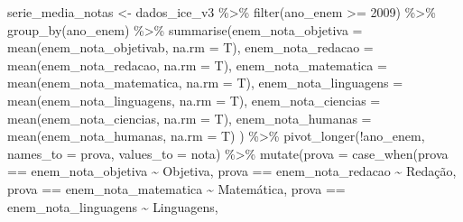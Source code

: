\documentclass[
  letterpaper,
  DIV=11,
  numbers=noendperiod]{scrartcl}
\newenvironment{Shaded}{\begin{snugshade}}{\end{snugshade}}
\newcommand{\AttributeTok}[1]{\textcolor[rgb]{0.40,0.45,0.13}{#1}}
\newcommand{\DecValTok}[1]{\textcolor[rgb]{0.68,0.00,0.00}{#1}}
\newcommand{\FunctionTok}[1]{\textcolor[rgb]{0.28,0.35,0.67}{#1}}
\newcommand{\NormalTok}[1]{\textcolor[rgb]{0.00,0.23,0.31}{#1}}
\newcommand{\OtherTok}[1]{\textcolor[rgb]{0.00,0.23,0.31}{#1}}
\newcommand{\SpecialCharTok}[1]{\textcolor[rgb]{0.37,0.37,0.37}{#1}}
\newcommand{\StringTok}[1]{\textcolor[rgb]{0.13,0.47,0.30}{#1}}
\begin{document}
\begin{Shaded}
\begin{Highlighting}[]
\NormalTok{serie\_media\_notas }\OtherTok{\textless{}{-}}
\NormalTok{  dados\_ice\_v3 }\SpecialCharTok{\%\textgreater{}\%} 
    \FunctionTok{filter}\NormalTok{(ano\_enem }\SpecialCharTok{\textgreater{}=} \DecValTok{2009}\NormalTok{) }\SpecialCharTok{\%\textgreater{}\%} 
    \FunctionTok{group\_by}\NormalTok{(ano\_enem) }\SpecialCharTok{\%\textgreater{}\%} 
     \FunctionTok{summarise}\NormalTok{(}\AttributeTok{enem\_nota\_objetiva =} \FunctionTok{mean}\NormalTok{(enem\_nota\_objetivab, }\AttributeTok{na.rm =}\NormalTok{ T),}
              \AttributeTok{enem\_nota\_redacao =} \FunctionTok{mean}\NormalTok{(enem\_nota\_redacao, }\AttributeTok{na.rm =}\NormalTok{ T),}
              \AttributeTok{enem\_nota\_matematica =} \FunctionTok{mean}\NormalTok{(enem\_nota\_matematica, }\AttributeTok{na.rm =}\NormalTok{ T),}
              \AttributeTok{enem\_nota\_linguagens =} \FunctionTok{mean}\NormalTok{(enem\_nota\_linguagens, }\AttributeTok{na.rm =}\NormalTok{ T),}
              \AttributeTok{enem\_nota\_ciencias =} \FunctionTok{mean}\NormalTok{(enem\_nota\_ciencias, }\AttributeTok{na.rm =}\NormalTok{ T),}
              \AttributeTok{enem\_nota\_humanas =} \FunctionTok{mean}\NormalTok{(enem\_nota\_humanas, }\AttributeTok{na.rm =}\NormalTok{ T)}
\NormalTok{              ) }\SpecialCharTok{\%\textgreater{}\%}
  \FunctionTok{pivot\_longer}\NormalTok{(}\SpecialCharTok{!}\NormalTok{ano\_enem, }
               \AttributeTok{names\_to =} \StringTok{\textquotesingle{}prova\textquotesingle{}}\NormalTok{,}
               \AttributeTok{values\_to =} \StringTok{\textquotesingle{}nota\textquotesingle{}}\NormalTok{) }\SpecialCharTok{\%\textgreater{}\%} 
  \FunctionTok{mutate}\NormalTok{(}\AttributeTok{prova =} \FunctionTok{case\_when}\NormalTok{(prova }\SpecialCharTok{==} \StringTok{\textquotesingle{}enem\_nota\_objetiva\textquotesingle{}} \SpecialCharTok{\textasciitilde{}} \StringTok{\textquotesingle{}Objetiva\textquotesingle{}}\NormalTok{,}
\NormalTok{                           prova }\SpecialCharTok{==} \StringTok{\textquotesingle{}enem\_nota\_redacao\textquotesingle{}} \SpecialCharTok{\textasciitilde{}} \StringTok{\textquotesingle{}Redação\textquotesingle{}}\NormalTok{,}
\NormalTok{                           prova }\SpecialCharTok{==} \StringTok{\textquotesingle{}enem\_nota\_matematica\textquotesingle{}} \SpecialCharTok{\textasciitilde{}} \StringTok{\textquotesingle{}Matemática\textquotesingle{}}\NormalTok{,}
\NormalTok{                           prova }\SpecialCharTok{==} \StringTok{\textquotesingle{}enem\_nota\_linguagens\textquotesingle{}} \SpecialCharTok{\textasciitilde{}} \StringTok{\textquotesingle{}Linguagens\textquotesingle{}}\NormalTok{,}

\end{Highlighting}
\end{Shaded}
\end{document}
